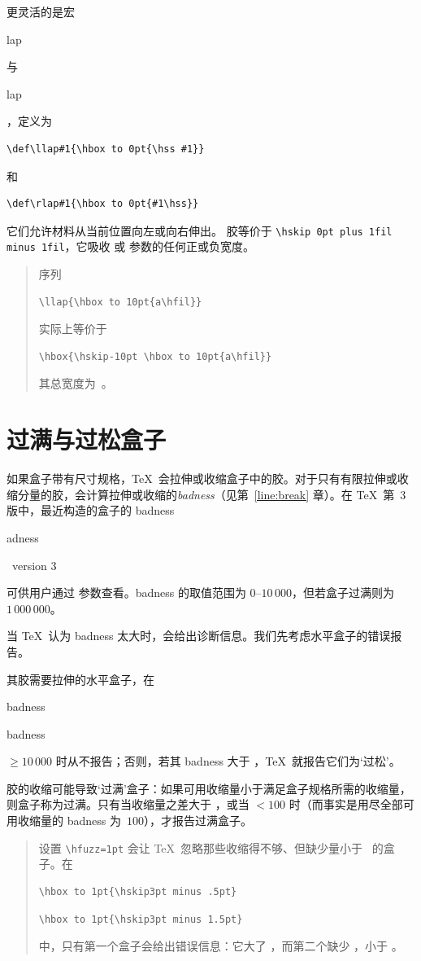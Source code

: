 \documentclass[a4paper]{rapport3}
\makeatletter
\newenvironment{example}{\begin{quotation}}{\end{quotation}}
\def\term#1\par{\index{#1}}
\def\cstoidx#1\par{\index{#1@\cs{#1}}}
\def\csidx#1{\cstoidx #1\par\cs{#1}}
\makeatother
\begin{document}
更灵活的是宏 \csidx{llap} 与 \csidx{rlap}\label{rlap}，定义为
\begin{verbatim}
\def\llap#1{\hbox to 0pt{\hss #1}}
\end{verbatim}
和
\begin{verbatim}
\def\rlap#1{\hbox to 0pt{#1\hss}}
\end{verbatim}
它们允许材料从当前位置向左或向右伸出。 胶等价于 \verb>\hskip 0pt plus 1fil minus 1fil>，它吸收  或  参数的任何正或负宽度。

\begin{example} 序列
\begin{verbatim}
\llap{\hbox to 10pt{a\hfil}}
\end{verbatim}
实际上等价于
\begin{verbatim}
\hbox{\hskip-10pt \hbox to 10pt{a\hfil}}
\end{verbatim}
其总宽度为~\n{0pt}。
\end{example}

\section{过满与过松盒子}
\label{over/underfull}

如果盒子带有尺寸规格，\TeX\ 会拉伸或收缩盒子中的胶。对于只有有限拉伸或收缩分量的胶，会计算拉伸或收缩的{\em badness\/}（见第~\ref{line:break} 章）。在 \TeX\ 第~3 版中，最近构造的盒子的 badness
\cstoidx badness\par\term \TeX\ version 3\par
可供用户通过  参数查看。badness 的取值范围为 0--$10\,000$，但若盒子过满则为~$1\,000\,000$。

当 \TeX\ 认为 badness 太大时，会给出诊断信息。我们先考虑水平盒子的错误报告。

其胶需要拉伸的水平盒子，在
\cstoidx hbadness\par\cstoidx vbadness\par
{}${}\geq10\,000$ 时从不报告；否则，若其 badness 大于 ，\TeX\ 就报告它们为`过松'。

胶的收缩可能导致`过满'盒子：如果可用收缩量小于满足盒子规格所需的收缩量，则盒子称为过满。只有当收缩量之差大于 ，或当 ${}<100$ 时（而事实是用尽全部可用收缩量的 badness 为~$100$），才报告过满盒子。

\begin{example} 设置 \verb>\hfuzz=1pt> 会让 \TeX\ 忽略那些收缩得不够、但缺少量小于~\n{1pt} 的盒子。在
\begin{verbatim}
\hbox to 1pt{\hskip3pt minus .5pt}
\end{verbatim}
\awp
\begin{verbatim}
\hbox to 1pt{\hskip3pt minus 1.5pt}
\end{verbatim}
中，只有第一个盒子会给出错误信息：它大了 \n{1.5pt}，而第二个缺少 \n{.5pt}，小于 。
\end{example}
\end{document}
